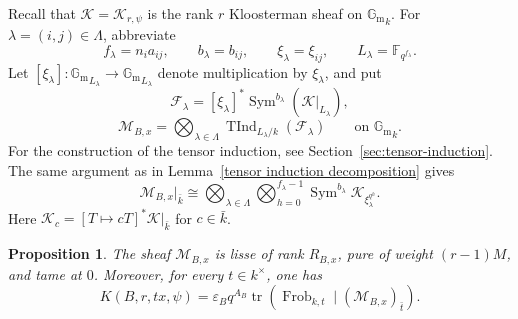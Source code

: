 \documentclass[11pt]{amsart}
\newtheorem{proposition}[theorem]{Proposition}
\theoremstyle{remark}
\newcommand{\F}{\mathbb F}
\newcommand{\Gm}{\mathbb G_{\mathrm m}}
\newcommand{\Frob}{\operatorname{Frob}}
\newcommand{\TInd}{\operatorname{TInd}}
\newcommand{\Sym}{\operatorname{Sym}}
\newcommand{\cF}{\mathcal F}
\newcommand{\cK}{\mathcal K}
\begin{document}
Recall that $\cK=\cK_{r,\psi}$ is the rank $r$ Kloosterman sheaf on ${\Gm}_k$. For $\lambda=(i,j)\in\Lambda$, abbreviate
\begin{equation}\label{eq:ss-abbreviations}
f_{\lambda}=n_i a_{ij},\qquad
b_{\lambda}=b_{ij},\qquad 
\xi_{\lambda}=\xi_{ij},\qquad
L_{\lambda}=\F_{q^{f_{\lambda}}}.
\end{equation}
Let $[\xi_{\lambda}]:{\Gm}_{L_{\lambda}}\to{\Gm}_{L_{\lambda}}$ denote multiplication
by $\xi_{\lambda}$, and put
\begin{equation}\label{eq:ss-factor-sheaf}
\cF_{\lambda}=[\xi_{\lambda}]^*
 \Sym^{b_{\lambda}}(\cK|_{L_{\lambda}}),
\end{equation}
\begin{equation}\label{eq:ss-M-sheaf}
\mathcal{M}_{B,x}=\bigotimes_{\lambda\in\Lambda}\TInd_{L_{\lambda}/k}(\cF_{\lambda})
 \qquad\text{on }{\Gm}_k.
\end{equation}
For the construction of the tensor induction, see Section~\ref{sec:tensor-induction}. The same argument as in Lemma~\ref{tensor induction decomposition} gives
\begin{equation}\label{eq:ss-geometric-decomposition}
\mathcal{M}_{B,x}|_{\bar{k}}\cong
\bigotimes_{\lambda\in\Lambda}\bigotimes_{h=0}^{f_{\lambda}-1}\Sym^{b_{\lambda}}\cK_{\xi_{\lambda}^{q^h}}.
\end{equation}
Here $\cK_c=[T\mapsto cT]^*\cK|_{\bar{k}}$ for $c\in \bar{k}$.

\begin{proposition}\label{prop:ss-M-properties}
The sheaf $\mathcal{M}_{B,x}$ is lisse of rank $R_{B,x}$, pure of weight
$(r-1)M$, and tame at $0$. Moreover, for every $t\in k^{\times}$, one has
\begin{equation}\label{eq:ss-K-trace}
K(B,r,tx,\psi)=\varepsilon_Bq^{A_B}
\operatorname{tr}\left(\Frob_{k,t}\mid(\mathcal{M}_{B,x})_{\bar{t}}\right).
\end{equation}
\end{proposition}
\end{document}
